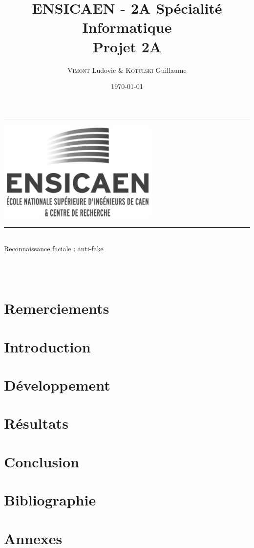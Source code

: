 \documentclass[a4paper]{report}
\title{ENSICAEN - 2A Spécialité Informatique\\Projet 2A}
\author{\textsc{Vimont} Ludovic \& \textsc{Kotulski} Guillaume}
\date{\today}
\newcommand{\HRule}{\rule{\linewidth}{0.5mm}}
\begin{document}
\begin{titlepage}
	\begin{center}
		\vspace*{\fill}
		\textsc{\Large \@title } 
		\HRule
		\vspace{1.5cm}
		\begin{center}
			\includegraphics[width=0.6\textwidth]{data/logo.png}
		\end{center}
		\vspace{1.5cm}
		\HRule \\
		\Large{Reconnaissance faciale : anti-fake}\\

		\large{\@author} \\
		\vspace*{\fill}

		 \\
		\@date
	\end{center}
\end{titlepage}

\chapter*{Remerciements}


\setcounter{tocdepth}{4}
\renewcommand{\contentsname}{Sommaire} 
\tableofcontents

\chapter{Introduction}


\chapter{Développement}


\chapter{Résultats}


\chapter{Conclusion}


\chapter{Bibliographie}


\appendix
\chapter{Annexes}

\end{document}
